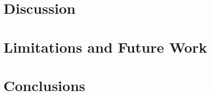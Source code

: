 \documentclass{article}
\begin{document}
\section{Discussion}
\label{sec:discussion}

\newpage

\section{Limitations and Future Work}
\label{sec:limitations}

\newpage

\section{Conclusions}
\label{sec:conclusions}

\newpage

\begingroup
\raggedright


\endgroup
\newpage


\end{document}
